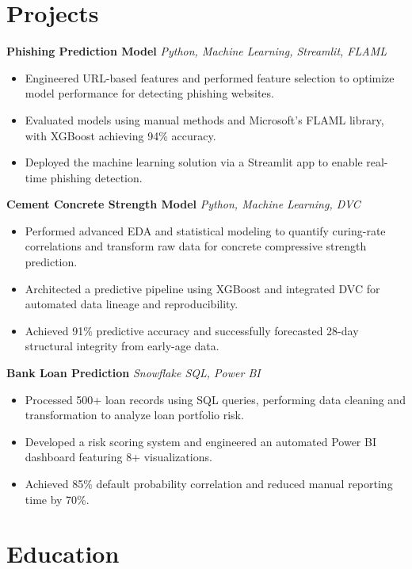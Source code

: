 \documentclass[10pt,a4paper]{article}
\begin{document}
\section*{Projects}

\textbf{Phishing Prediction Model} \hfill \textit{Python, Machine Learning, Streamlit, FLAML}\\
\begin{itemize}
\item Engineered URL-based features and performed feature selection to optimize model performance for detecting phishing websites.
\item Evaluated models using manual methods and Microsoft's FLAML library, with XGBoost achieving 94\% accuracy.
\item Deployed the machine learning solution via a Streamlit app to enable real-time phishing detection.
\end{itemize}
\vspace{1pt}
\textbf{Cement Concrete Strength Model} \hfill \textit{Python, Machine Learning, DVC}\\
\begin{itemize}
\item Performed advanced EDA and statistical modeling to quantify curing-rate correlations and transform raw data for concrete compressive strength prediction.
\item Architected a predictive pipeline using XGBoost and integrated DVC for automated data lineage and reproducibility.
\item Achieved 91\% predictive accuracy and successfully forecasted 28-day structural integrity from early-age data.
\end{itemize}
\vspace{1pt}
\textbf{Bank Loan Prediction} \hfill \textit{Snowflake SQL, Power BI}\\
\begin{itemize}
\item Processed 500+ loan records using SQL queries, performing data cleaning and transformation to analyze loan portfolio risk.
\item Developed a risk scoring system and engineered an automated Power BI dashboard featuring 8+ visualizations.
\item Achieved 85\% default probability correlation and reduced manual reporting time by 70\%.
\end{itemize}
\vspace{1pt}

\section*{Education}
\end{document}
